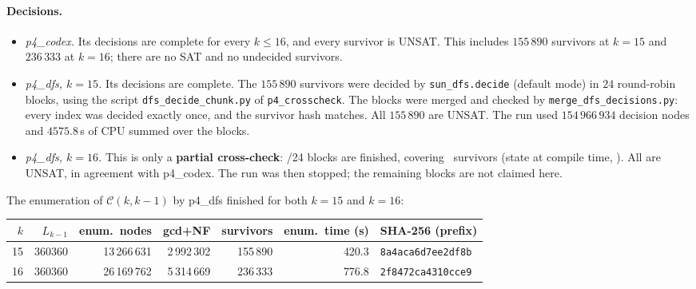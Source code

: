 \documentclass[11pt]{article}
\theoremstyle{definition}
\theoremstyle{remark}
\newcommand{\C}{\mathcal{C}}
\begin{document}
\paragraph{Decisions.}\sloppy
\begin{itemize}
\item \emph{p4\_codex.} Its decisions are complete for every $k\le16$, and every survivor is
  UNSAT. This includes $155\,890$ survivors at $k=15$ and $236\,333$ at $k=16$; there are no
  SAT and no undecided survivors.
\item \emph{p4\_dfs, $k=15$.} Its decisions are complete. The $155\,890$ survivors were decided
  by \texttt{sun\_dfs.decide} (default mode) in $24$ round-robin blocks, using the script
  \texttt{dfs\_decide\_chunk.py} of \texttt{p4\_crosscheck}. The blocks were merged and checked by
  \texttt{merge\_dfs\_decisions.py}: every index was decided exactly once, and the survivor hash
  matches. All $155\,890$ are UNSAT. The run used $154\,966\,934$ decision nodes and
  $4575.8$\,s of CPU summed over the blocks.
\item \emph{p4\_dfs, $k=16$.} This is only a \textbf{partial cross-check}: \kXVIblocks/24 blocks
  are finished, covering \kXVIdecided\ survivors (state at compile time, \kXVIstamp). All are
  UNSAT, in agreement with p4\_codex. The run was then stopped; the remaining blocks are not
  claimed here.
\end{itemize}\fussy
The enumeration of $\C(k,k-1)$ by p4\_dfs finished for both $k=15$ and $k=16$:
\begin{center}\small
\begin{tabular}{rrrrrrl}
\toprule
$k$ & $L_{k-1}$ & enum.\ nodes & gcd+NF & survivors & enum.\ time (s) & SHA-256 (prefix)\\
\midrule
15 & 360360 & 13\,266\,631 & 2\,992\,302 & 155\,890 & 420.3 & \texttt{8a4aca6d7ee2df8b}\\
16 & 360360 & 26\,169\,762 & 5\,314\,669 & 236\,333 & 776.8 & \texttt{2f8472ca4310cce9}\\
\bottomrule
\end{tabular}
\end{center}
\end{document}

